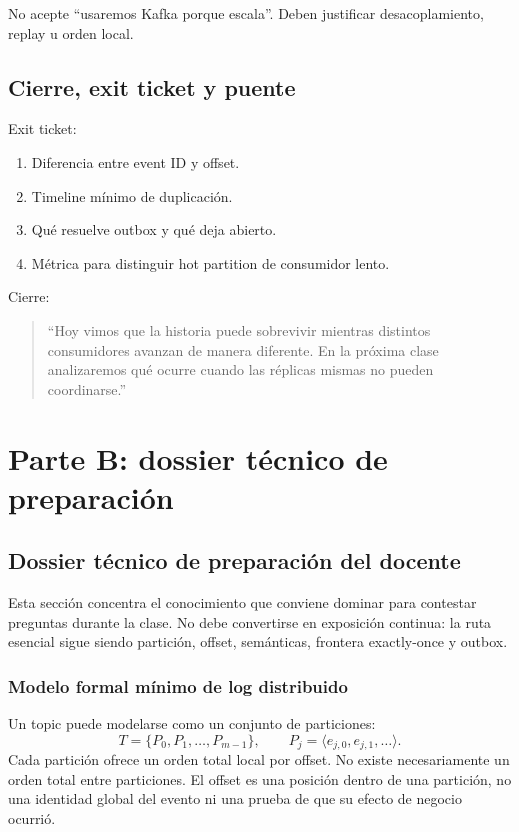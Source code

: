 \documentclass[variant=docente,cover=institutional,mode=screen]{ua-engineering-v6-article}
\begin{document}
No acepte ``usaremos Kafka porque escala''. Deben justificar desacoplamiento, replay u orden local.

\subsection{Cierre, exit ticket y puente}

Exit ticket:
\begin{enumerate}
\item Diferencia entre event ID y offset.
\item Timeline mínimo de duplicación.
\item Qué resuelve outbox y qué deja abierto.
\item Métrica para distinguir hot partition de consumidor lento.
\end{enumerate}

Cierre:
\begin{quote}
``Hoy vimos que la historia puede sobrevivir mientras distintos consumidores avanzan de manera diferente. En la próxima clase analizaremos qué ocurre cuando las réplicas mismas no pueden coordinarse.''
\end{quote}


\clearpage
\section{Parte B: dossier técnico de preparación}
\subsection{Dossier técnico de preparación del docente}
Esta sección concentra el conocimiento que conviene dominar para contestar preguntas durante la clase. No debe convertirse en exposición continua: la ruta esencial sigue siendo partición, offset, semánticas, frontera exactly-once y outbox.

\subsubsection{Modelo formal mínimo de log distribuido}

Un topic puede modelarse como un conjunto de particiones:
\[
T=\{P_0,P_1,\ldots,P_{m-1}\},\qquad
P_j=\langle e_{j,0},e_{j,1},\ldots\rangle.
\]
Cada partición ofrece un orden total local por offset. No existe necesariamente un orden total entre particiones. El offset es una posición dentro de una partición, no una identidad global del evento ni una prueba de que su efecto de negocio ocurrió.
\end{document}
